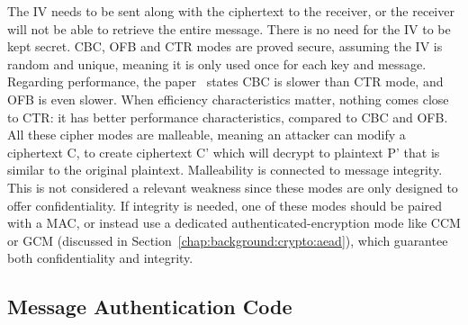 The \ac{IV} needs to be sent along with the ciphertext to the receiver, or the receiver will not be able to retrieve the entire message. There is no need for the IV to be kept secret.
\ac{CBC}, \ac{OFB} and \ac{CTR} modes are proved secure, assuming the \ac{IV} is random and unique, meaning it is only used once for each key and message.
Regarding performance, the paper~\cite{aesmodes} states \ac{CBC} is slower than \ac{CTR} mode, and \ac{OFB} is even slower.
When efficiency characteristics matter, nothing comes close to \ac{CTR}: it has better performance characteristics, compared to \ac{CBC} and \ac{OFB}.
All these cipher modes are malleable, meaning an attacker can modify a ciphertext C, to create ciphertext C' which will decrypt to plaintext P' that is similar to the original plaintext. Malleability is connected to message integrity. This is not considered a relevant weakness since these modes are only designed to offer confidentiality. If integrity is needed, one of these modes should be paired with a \ac{MAC}, or instead use a dedicated authenticated-encryption mode like \ac{CCM} or \ac{GCM} (discussed in Section~\ref{chap:background:crypto:aead}), which guarantee both confidentiality and integrity.



\subsection{Message Authentication Code}\label{chap:background:crypto:mac}

